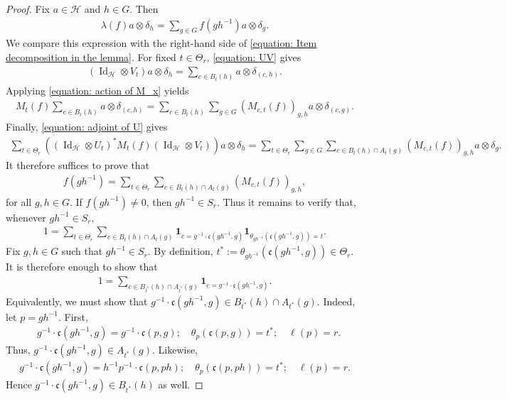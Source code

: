 \documentclass[12pt,reqno]{amsart}
\newcommand{\Id}{\operatorname{Id}}
\newcommand{\Hil}{\mathcal{H}}
\numberwithin{equation}{section}
\begin{document}
\begin{proof}
Fix $a\in\Hil$ and $h\in G$. Then
\begin{align*}
    \lambda(f)a\otimes \delta_h=\sum_{g\in G}f(gh^{-1})a\otimes \delta_g.
\end{align*}
We compare this expression with the right-hand side of \eqref{equation: Item decomposition in the lemma}. For fixed $t\in\Theta_r$, \eqref{equation: UV} gives
\begin{align*}
    (\Id_{\Hil}\otimes V_t)a\otimes \delta_h= \sum_{c\in B_t(h)} a\otimes \delta_{(c,h)}.
\end{align*}
Applying \eqref{equation: action of M_x} yields
\begin{align*}
    M_{t}(f)\sum_{c\in B_t(h)} a\otimes \delta_{(c,h)}=\sum_{c\in B_t(h)}\sum_{g\in G}(M_{c,t}(f))_{g,h} a\otimes \delta_{(c,g)}.
\end{align*}
Finally, \eqref{equation: adjoint of U} gives
\begin{align*}
    \sum_{t\in \Theta_r}\left((\Id_{\Hil}\otimes U_t)^* M_{t}(f)(\Id_{\Hil}\otimes V_t)\right)a\otimes \delta_h=\sum_{t\in \Theta_r}\sum_{g\in G}\sum_{c\in B_t(h)\cap A_t(g)}(M_{c,t}(f))_{g,h} a\otimes \delta_g.
\end{align*}
It therefore suffices to prove that
\begin{align*}
    f(gh^{-1})=\sum_{t\in \Theta_r}\sum_{c\in B_t(h)\cap A_t(g)}(M_{c,t}(f))_{g,h},
\end{align*}
for all $g,h\in G$. If $f(gh^{-1})\ne0$, then $gh^{-1}\in S_r$. Thus it remains to verify that, whenever $gh^{-1}\in S_r$,
\begin{align*}
    1=\sum_{t\in \Theta_r}\sum_{c\in B_t(h)\cap A_t(g)}\mathbf{1}_{c=g^{-1}\cdot\mathfrak{c}(gh^{-1},g)}\mathbf{1}_{\theta_{gh^{-1}}(\mathfrak{c}(gh^{-1},g))=t}.
\end{align*}
Fix $g,h\in G$ such that $gh^{-1}\in S_r$. By definition, $t^*:=\theta_{gh^{-1}}(\mathfrak{c}(gh^{-1},g))\in \Theta_r$.
It is therefore enough to show that
\begin{align*}
    1=\sum_{c\in B_{t^*}(h)\cap A_{t^*}(g)}\mathbf{1}_{c=g^{-1}\cdot\mathfrak{c}(gh^{-1},g)}.
\end{align*}
Equivalently, we must show that $g^{-1}\cdot\mathfrak{c}(gh^{-1},g)\in B_{t^*}(h)\cap A_{t^*}(g)$. Indeed, let $p=gh^{-1}$. First,
\begin{align*}
    &g^{-1}\cdot\mathfrak{c}(gh^{-1},g)=g^{-1}\cdot \mathfrak{c}(p,g);\quad \theta_p(\mathfrak{c}(p,g))=t^*;\quad \ell(p)=r.
\end{align*}
Thus, $g^{-1}\cdot\mathfrak{c}(gh^{-1},g)\in A_{t^*}(g)$. Likewise,
\begin{align*}
    g^{-1}\cdot\mathfrak{c}(gh^{-1},g)=h^{-1}p^{-1}\cdot \mathfrak{c}(p,ph);\quad \theta_p(\mathfrak{c}(p,ph))=t^*;\quad \ell(p)=r.
\end{align*}
Hence $g^{-1}\cdot\mathfrak{c}(gh^{-1},g)\in B_{t^*}(h)$ as well.
\end{proof}
\end{document}
